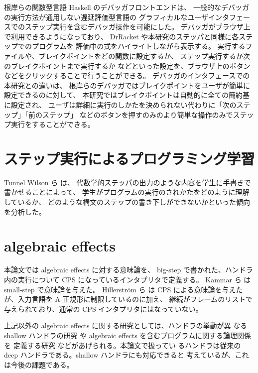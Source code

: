 根岸ら\cite{NI2009}の関数型言語 Haskell のデバッガフロントエンドは、
一般的なデバッガの実行方法が通用しない遅延評価型言語の
グラフィカルなユーザインタフェースでのステップ実行を含むデバッガ操作を可能にした。
デバッガがブラウザ上で利用できるようになっており、
DrRacket や本研究のステッパと同様に各ステップでのプログラムを
評価中の式をハイライトしながら表示する。
実行するファイルや、ブレイクポイントをどの関数に設定するか、
ステップ実行するか次のブレイクポイントまで実行するか
などといった設定を、ブラウザ上のボタンなどをクリックすることで行うことができる。
デバッガのインタフェースでの本研究との違いは、
根岸ら\cite{NI2009}のデバッガではブレイクポイントをユーザが簡単に設定できるのに対して、
本研究ではブレイクポイントは自動的に全ての簡約基に設定され、
ユーザは詳細に実行のしかたを決められない代わりに「次のステップ」「前のステップ」
などのボタンを押すのみのより簡単な操作のみでステップ実行をすることができる。

\section{ステップ実行によるプログラミング学習}

Tunnel Wilson ら \cite{tunnell18} は、
代数学的ステッパの出力のような内容を学生に手書きで書かせることによって、
学生がプログラムの実行のされかたをどのように理解しているか、
どのような構文のステップの書き下しができないかといった傾向を分析した。

\section{algebraic effects}
\label{section:algebraic effects__related}

本論文では algebraic effects に対する意味論を、
big-step で書かれた、ハンドラ内の実行について CPS になっているインタプリタで定義する。
Kammar ら \cite{10.1145/2500365.2500590} は small-step で意味論を与えた。
Hillerstr{\"o}m ら \cite{e6cb0c3222794e48bf38cf44e46fe4aa} は
CPS による意味論を与えたが、入力言語を A-正規形に制限しているのに加え、
継続がフレームのリストで与えられており、通常の CPS インタプリタにはなっていない。

上記以外の algebraic effects に関する研究としては、ハンドラの挙動が異
なる shallow ハンドラの研究 \cite{10.1007/978-3-030-02768-1_22} や
algebraic effects を含むプログラムに関する論理関係を
定義する研究 \cite{10.1145/3158096} などがあげられる。本論文で扱ってい
るハンドラは従来の deep ハンドラである。shallow ハンドラにも対応できると
考えているが、これは今後の課題である。
